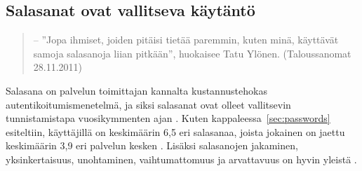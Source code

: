 \documentclass[english,gradu]{tktltiki}
\begin{document}

\subsection{Salasanat ovat vallitseva käytäntö} %
\label{sub:salasanat_ovat_vallitseva_käytäntö}
\label{sec:passwords_de_facto}


  \begin{quote}
    -- ''Jopa ihmiset, joiden pitäisi tietää paremmin, kuten minä, käyttävät samoja salasanoja liian pitkään'', huokaisee Tatu Ylönen. (Taloussanomat 28.11.2011)
  \end{quote}


             Salasana on palvelun toimittajan kannalta kustannustehokas autentikoitumismenetelmä, ja siksi salasanat ovat olleet vallitsevin tunnistamistapa vuosikymmenten ajan \cite{pw_auth_system_perspective_08}. Kuten kappaleessa~\ref{sec:passwords} esiteltiin, käyttäjillä on keskimäärin 6,5 eri salasanaa, joista jokainen on jaettu keskimäärin 3,9 eri palvelun kesken \cite{study_of_passwords_07}. Lisäksi salasanojen jakaminen, yksinkertaisuus, unohtaminen, vaihtumattomuus ja arvattavuus on hyvin yleistä \cite{password_management_strategies_06, pw_auth_system_perspective_08, passpet_06}.
\end{document}
